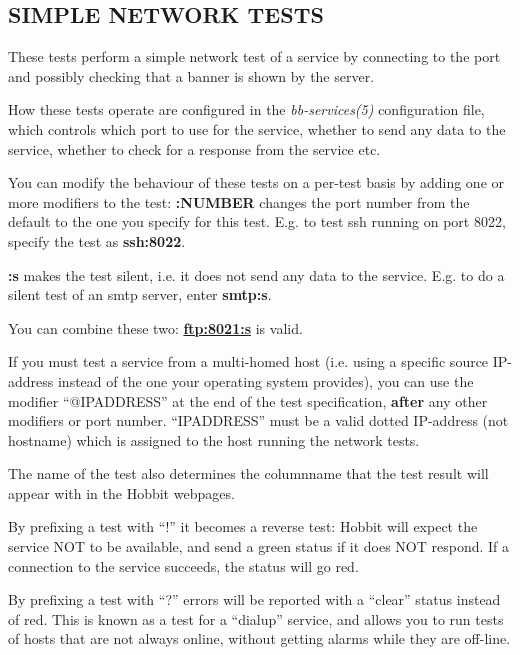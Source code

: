 \subsection{SIMPLE NETWORK TESTS}
 These tests perform a simple network test of a service by connecting
 to the port and possibly checking that a banner is shown by the
 server. 


  How these tests operate are configured in the \emph{bb-services(5)}
  configuration file, which controls which port to use for the
  service, whether to send any data to the service, whether to check
  for a response from the service etc. 



  You can modify the behaviour of these tests on a per-test basis by
  adding one or more modifiers to the test: \textbf{:NUMBER} changes
  the port number from the default to the one you specify for this
  test. E.g. to test ssh running on port 8022, specify the test as
  \textbf{ssh:8022}. 


 \textbf{:s}
 makes the test silent, i.e. it does not send any data to the
 service. E.g. to do a silent test of an smtp server, enter
 \textbf{smtp:s}. 



  You can combine these two: \textbf{\url{ftp:8021:s}}
 is valid. 


  If you must test a service from a multi-homed host (i.e. using a
  specific source IP-address instead of the one your operating system
  provides), you can use the modifier ``@IPADDRESS'' at the end of the
  test specification, \textbf{after} any other modifiers or port
  number. ``IPADDRESS'' must be a valid dotted IP-address (not
  hostname) which is assigned to the host running the network tests. 



  The name of the test also determines the columnname that the test
  result will appear with in the Hobbit webpages. 



  By prefixing a test with ``!'' it becomes a reverse test: Hobbit
  will expect the service NOT to be available, and send a green status
  if it does NOT respond. If a connection to the service succeeds, the
  status will go red. 



  By prefixing a test with ``?'' errors will be reported with a
  ``clear'' status instead of red. This is known as a test for a
  ``dialup'' service, and allows you to run tests of hosts that are
  not always online, without getting alarms while they are off-line. 



